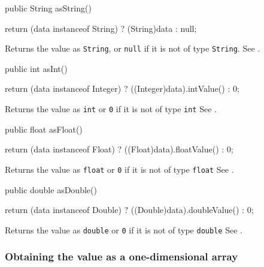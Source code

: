 \begin{code}

   public String asString() \begin{hide} {
      return (data instanceof String) ? (String)data : null;
   }
   \end{hide}
\end{code}
\begin{tabb}
Returns the value as \texttt{String}, or \texttt{null} if it is not
  of type \texttt{String}.
See .
\end{tabb}
\begin{code}
   
   public int asInt() \begin{hide} {
      return (data instanceof Integer) ? ((Integer)data).intValue() : 0;
   }
   \end{hide}
\end{code}
\begin{tabb}
Returns the value as \texttt{int} or \texttt{0} if it is not of type \texttt{int}
See .
\end{tabb}
\begin{code}
   
   public float asFloat() \begin{hide} {
      return (data instanceof Float) ? ((Float)data).floatValue() : 0;
   }
   \end{hide}
\end{code}
\begin{tabb}
Returns the value as \texttt{float} or \texttt{0} if it is not of type \texttt{float}
See .
\end{tabb}
\begin{code}
   
   public double asDouble() \begin{hide} {
      return (data instanceof Double) ? ((Double)data).doubleValue() : 0;
   }
   \end{hide}
\end{code}
\begin{tabb}
Returns the value as \texttt{double} or \texttt{0} if it is not of type \texttt{double}
See .
\end{tabb}

   
\subsubsection*{Obtaining the value as a one-dimensional array}

